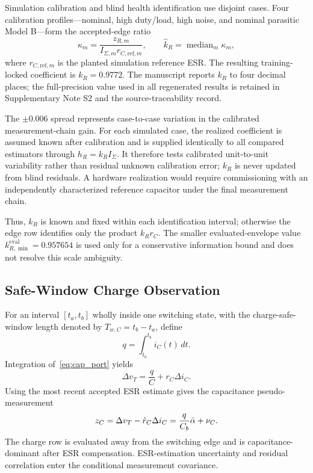 Simulation calibration and blind health identification use disjoint cases. Four calibration profiles---nominal, high duty/load, high noise, and nominal parasitic Model B---form the accepted-edge ratio
\begin{equation}
\kappa_m=\frac{z_{R,m}}{I_{\Sigma,m}r_{C,\mathrm{ref},m}},
\qquad
\hat k_R=\operatorname{median}_m\kappa_m,
\label{eq:kr_calibration}
\end{equation}
where $r_{C,\mathrm{ref},m}$ is the planted simulation reference ESR. The resulting training-locked coefficient is $k_R=0.9772$. The manuscript reports $k_R$ to four decimal places; the full-precision value used in all regenerated results is retained in Supplementary Note S2 and the source-traceability record.

The $\pm0.006$ spread represents case-to-case variation in the calibrated measurement-chain gain. For each simulated case, the realized coefficient is assumed known after calibration and is supplied identically to all compared estimators through $h_R=k_RI_\Sigma$. It therefore tests calibrated unit-to-unit variability rather than residual unknown calibration error; $k_R$ is never updated from blind residuals. A hardware realization would require commissioning with an independently characterized reference capacitor under the final measurement chain.

Thus, $k_R$ is known and fixed within each identification interval; otherwise the edge row identifies only the product $k_Rr_C$. The smaller evaluated-envelope value $k_{R,\min}^{\mathrm{eval}}=0.957654$ is used only for a conservative information bound and does not resolve this scale ambiguity.

\subsection{Safe-Window Charge Observation}

For an interval $[t_a,t_b]$ wholly inside one switching state, with the charge-safe-window length denoted by $T_{w,C}=t_b-t_a$, define
\begin{equation}
q=\int_{t_a}^{t_b}i_C(t)\,dt.
\label{eq:charge}
\end{equation}
Integration of~\eqref{eq:cap_port} yields
\begin{equation}
\Delta v_T=\frac{q}{C}+r_C\Delta i_C.
\label{eq:integral_port}
\end{equation}
Using the most recent accepted ESR estimate gives the capacitance pseudo-measurement
\begin{equation}
z_C=\Delta v_T-\hat r_C\Delta i_C
=\frac{q}{C_b}\bar{\alpha}+\nu_C.
\label{eq:c_observation}
\end{equation}
The charge row is evaluated away from the switching edge and is capacitance-dominant after ESR compensation. ESR-estimation uncertainty and residual correlation enter the conditional measurement covariance.

